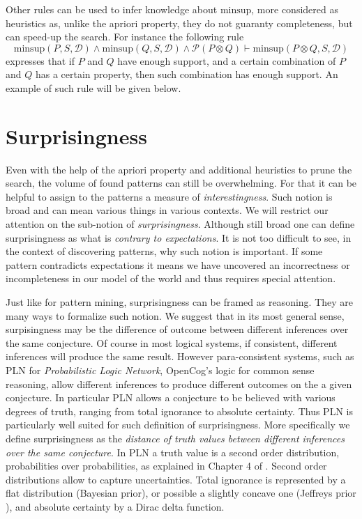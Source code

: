 \documentclass[runningheads]{llncs}
\begin{document}
Other rules can be used to infer knowledge about $\text{minsup}$, more
considered as heuristics as, unlike the apriori property, they do not
guaranty completeness, but can speed-up the search. For instance the
following rule
$$ \text{minsup}(P, S, \mathcal{D}) \land \text{minsup}(Q, S,
\mathcal{D}) \land \mathcal{P}(P \otimes Q) \vdash \text{minsup}(P
\otimes Q, S, \mathcal{D}) $$ expresses that if $P$ and $Q$ have
enough support, and a certain combination of $P$ and $Q$ has a certain
property, then such combination has enough support. An example of such
rule will be given below.

\section{Surprisingness}

Even with the help of the apriori property and additional heuristics
to prune the search, the volume of found patterns can still be
overwhelming. For that it can be helpful to assign to the patterns a
measure of \emph{interestingness}. Such notion is broad and can mean
various things in various contexts. We will restrict our attention on
the sub-notion of \emph{surprisingness}. Although still broad one can
define surprisingness as what is \emph{contrary to expectations}. It
is not too difficult to see, in the context of discovering patterns,
why such notion is important. If some pattern contradicts expectations
it means we have uncovered an incorrectness or incompleteness in our
model of the world and thus requires special attention.

Just like for pattern mining, surprisingness can be framed as
reasoning. They are many ways to formalize such notion. We suggest
that in its most general sense, surpisingness may be the difference of
outcome between different inferences over the same conjecture. Of
course in most logical systems, if consistent, different inferences
will produce the same result. However para-consistent systems, such as
PLN \cite{Goertzel2009PLN} for \emph{Probabilistic Logic Network},
OpenCog's logic for common sense reasoning, allow different inferences
to produce different outcomes on the a given conjecture. In particular
PLN allows a conjecture to be believed with various degrees of truth,
ranging from total ignorance to absolute certainty. Thus PLN is
particularly well suited for such definition of surprisingness. More
specifically we define surprisingness as the \emph{distance of truth
  values between different inferences over the same conjecture}. In
PLN a truth value is a second order distribution, probabilities over
probabilities, as explained in Chapter 4 of
\cite{Goertzel2009PLN}. Second order distributions allow to capture
uncertainties. Total ignorance is represented by a flat distribution
(Bayesian prior), or possible a slightly concave one (Jeffreys prior
\cite{Jeffreys46Invariant}), and absolute certainty by a Dirac delta
function.
\end{document}

